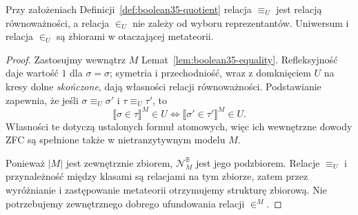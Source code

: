 \begin{lemat}
\label{lem:boolean35-quotient-defined}
Przy założeniach
Definicji~\ref{def:boolean35-quotient}
relacja $\equiv_U$ jest relacją
równoważności, a relacja $\in_U$
nie zależy od wyboru reprezentantów.
Uniwersum i relacja $\in_U$ są
zbiorami w otaczającej metateorii.
\end{lemat}
\begin{proof}
Zastosujmy wewnątrz $M$
Lemat~\ref{lem:boolean35-equality}.
Refleksyjność daje wartość $1$
dla $\sigma=\sigma$;
symetria i przechodniość,
wraz z domknięciem $U$ na
kresy dolne \emph{skończone},
dają własności relacji
równoważności. Podstawianie
zapewnia, że jeśli
$\sigma\equiv_U\sigma'$ i
$\tau\equiv_U\tau'$, to
\[
\llbracket\sigma\in\tau\rrbracket^M\in U
\iff
\llbracket\sigma'\in\tau'\rrbracket^M\in U.
\]
Własności te dotyczą ustalonych
formuł atomowych, więc ich
wewnętrzne dowody ZFC
są spełnione także w
nietranzytywnym modelu $M$.

Ponieważ $|M|$ jest zewnętrznie
zbiorem, $\mathcal N_M^{\mathbb B}$
jest jego podzbiorem.
Relacje $\equiv_U$ i
przynależność między klasami
są relacjami na tym zbiorze,
zatem przez wyróżnianie i
zastępowanie metateorii
otrzymujemy strukturę zbiorową.
Nie potrzebujemy zewnętrznego
dobrego ufundowania relacji $\in^M$.
\end{proof}

